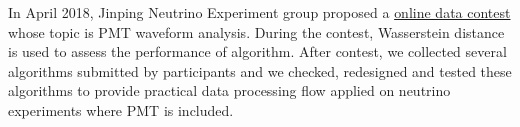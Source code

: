 \acknowledgments
In April 2018, Jinping Neutrino Experiment group proposed a \href{https://mp.weixin.qq.com/s?__biz=MzA4MTAwMzgzOA==&mid=2650872289&idx=2&sn=48145a6598545d201f940e0459de99dd&chksm=846e2db0b319a4a627e902d0d6ed4b9d968225566021342c5935764963f352fbe02db1bdb333&mpshare=1&scene=1&srcid=0307c4HOvK0ChJUcq9blC3ub%23rd}{online data contest} whose topic is PMT waveform analysis. During the contest, Wasserstein distance is used to assess the performance of algorithm. After contest, we collected several algorithms submitted by participants and we checked, redesigned and tested these algorithms to provide practical data processing flow applied on neutrino experiments where PMT is included. 
